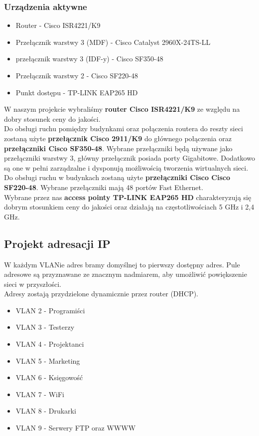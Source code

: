 \documentclass[a4paper,12pt]{extarticle}  %
\begin{document}
\subsubsection{Urządzenia aktywne}
\begin{itemize}
	\item Router - Cisco ISR4221/K9
	\item Przełącznik warstwy 3 (MDF) - Cisco Catalyst 2960X-24TS-LL
	\item przełącznik warstwy 3 (IDF-y) - Cisco SF350-48
	\item Przełącznik warstwy 2 - Cisco SF220-48
	\item Punkt dostępu - TP-LINK EAP265 HD
\end{itemize}
W naszym projekcie wybraliśmy \textbf{router Cisco ISR4221/K9} ze względu na dobry stosunek
ceny do jakości. \\

Do obsługi ruchu pomiędzy budynkami oraz połączenia routera do reszty sieci zostaną użyte
\textbf{przełącznik Cisco 2911/K9} do głównego połączenia oraz \textbf{przełączniki Cisco SF350-48}.
Wybrane przełączniki będą używane jako przełączniki warstwy 3, główny przełącznik posiada porty Gigabitowe.
Dodatkowo są one w pełni zarządzalne i dysponują możliwością tworzenia wirtualnych sieci.\\

Do obsługi ruchu w budynkach zostaną użyte \textbf{przełączniki Cisco Cisco SF220-48}.
Wybrane przełączniki mają 48 portów Fast Ethernet.\\

Wybrane przez nas \textbf{access pointy TP-LINK EAP265 HD} charakteryzują się dobrym stosunkiem ceny
do jakości oraz działają na częstotliwościach 5 GHz i 2,4 GHz.

\subsection{Projekt adresacji IP}
W każdym VLANie adres bramy domyślnej to pierwszy dostępny adres.
Pule adresowe są przyznawane ze znacznym nadmiarem, aby umożliwić powiększenie sieci w przyszłości.\\
Adresy zostają przydzielone dynamicznie przez router (DHCP).\\

\begin{itemize}
	\item VLAN 2 - Programiści
	\item VLAN 3 - Testerzy
	\item VLAN 4 - Projektanci
	\item VLAN 5 - Marketing
	\item VLAN 6 - Księgowość
	\item VLAN 7 - WiFi
	\item VLAN 8 - Drukarki
	\item VLAN 9 - Serwery FTP oraz WWWW
\end{itemize}
\end{document}

